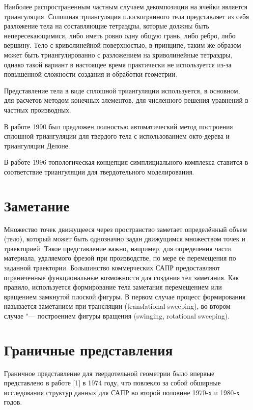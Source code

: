 {{{{{{Наиболее распространенным частным случаем декомпозиции на ячейки является триангуляция. Сплошная триангуляция плоскогранного тела представляет из себя разложение тела на составляющие тетраэдры, которые должны быть непересекающимися, либо иметь ровно одну общую грань, либо ребро, либо вершину. Тело с криволинейной поверхностью, в принципе, таким же образом может быть триангулированно с разложением на криволинейные тетраэдры, однако такой вариант в настоящее время практически не используется из-за повышенной сложности создания и обработки геометрии.

Представление тела в виде сплошной триангуляции используется, в основном, для расчетов методом конечных элементов, для численного решения уравнений в частных производных.

В работе \cite{A combined octree/Delaunay method for fully automatic 3-d mesh generation} 1990 был предложен полностью автоматический метод построения сплошной триангуляции для твердого тела с использованием окто-дерева и триангуляции Делоне.

В работе \cite{Modeling with Simplicial Complexes} 1996 топологическая концепция симплициального комплекса ставится в соответствие триангуляции для твердотельного моделирования. 

\section{Заметание} \label{sect_sweeping}

Множество точек движущееся через пространство заметает определённый объем (тело), который может быть однозначно задан движущимся множеством точек и траекторией. Такое представление важно, например, для определения части материала, удаляемого фрезой при производстве, по мере её перемещения по заданной траектории. Большинство коммерческих САПР предоставляют ограниченные функциональные возможности для создания тел заметания. Как правило, используется формирование тела заметания перемещением или вращением замкнутой плоской фигуры. В первом случае процесс формирования называется заметанием при трансляции (translational sweeping), во втором случае "--- построением фигуры вращения (swinging, rotational sweeping).

\section{Граничные представления} \label{sect_boundary_rep}

Граничное представление для твердотельной геометрии было впервые представлено в работе [1] в 1974 году, что повлекло за собой обширные исследования структур данных для САПР во второй половине 1970-х и 1980-х годов.

}}}}}}
